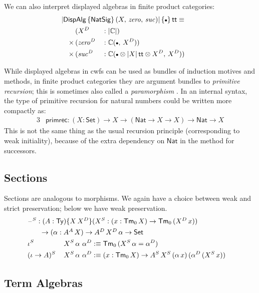 \documentclass[12pt,a4paper,twoside,openany]{book}
\theoremstyle{remark}
\theoremstyle{definition}
\theoremstyle{theorem}
\newcommand{\mi}[1]{\mathit{#1}}
\newcommand{\ms}[1]{\mathsf{#1}}
\newcommand{\mbb}[1]{\mathbb{#1}}
\newcommand{\Tm}{\mathsf{Tm}}
\newcommand{\Ty}{\mathsf{Ty}}
\renewcommand{\tt}{\mathsf{tt}}
\newcommand{\blank}{\mathord{\hspace{1pt}\text{--}\hspace{1pt}}}
\newcommand{\Set}{\mathsf{Set}}
\newcommand{\emptycon}{\scaleobj{.75}\bullet}
\newcommand{\DispAlg}{\ms{DispAlg}}
\newcommand{\Nat}{\ms{Nat}}
\newcommand{\mbbC}{\mbb{C}}
\newcommand{\defn}{:\equiv}
\begin{document}
We can also interpret displayed algebras in finite product categories:
\begin{alignat*}{3}
  & \hspace{-2em}\rlap{$|\DispAlg\,\{\ms{NatSig}\}\,(X,\,\mi{zero},\,\mi{suc})|\,\{\emptycon\}\,\tt \equiv$}\\
              & (X^D &&: |\mbbC|)\\
      \times\,& (\mi{zero^D} &&: \mbbC(\emptycon,\,X^D))\\
      \times\,& (\mi{suc^D} &&: \mbbC(\emptycon \otimes |X|\,\tt \otimes X^D,\, X^D))
\end{alignat*}

While displayed algebras in cwfs can be used as bundles of induction motives and
methods, in finite product categories they are argument bundles to
\emph{primitive recursion}; this is sometimes also called a
\emph{paramorphism} \cite{bananas}. In an internal syntax, the type of primitive
recursion for natural numbers could be written more compactly as:
\begin{alignat*}{3}
  & \ms{primrec} : (X : \Set) \to X \to (\Nat \to X \to X) \to \Nat \to X
\end{alignat*}
This is not the same thing as the usual recursion principle (corresponding to
weak initiality), because of the extra dependency on $\Nat$ in the method for
successors.

\subsection{Sections}
Sections are analogous to morphisms. We again have a choice between weak and
strict preservation; below we have weak preservation.
\begin{alignat*}{3}
  & \rlap{$\blank^S : (A : \Ty)\{X\,X^D\}(X^S : (x : \Tm_0\,X)\to \Tm_0\,(X^D\,x))$}\\
  & \hspace{2em}\rlap{$\to (\alpha : A^A\,X) \to A^D\,X^D\,\alpha \to \Set$}\\
  & \iota^S\,&&X^S\,\alpha\,\,\alpha^D \defn \Tm_0\,(X^S\,\alpha = \alpha^D) \\
  & (\iota\to A)^S\,&&X^S\,\alpha\,\,\alpha^D \defn
  (x : \Tm_0\,X) \to A^S\,X^S\,(\alpha\,x)\,(\alpha^D\,(X^S\,x))
\end{alignat*}

\subsection{Term Algebras}
\label{sec:simple-2ltt-term-algebras}
\end{document}
